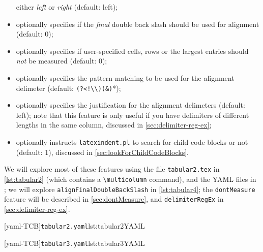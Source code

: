 \begin{itemize}
		      either \emph{left} or \emph{right} (default: left);
		\item {}
		      optionally specifies if the \emph{final} double back slash should be used for alignment
		      (default: 0);
		\item {} optionally specifies if
		      user-specified cells, rows or the largest entries should \emph{not} be measured (default:
		      0);
		\item {} optionally specifies the
		      pattern matching to be used for the alignment delimeter (default:
		      \lstinline* '(?<!\\)(&)'*);
		\item {} optionally
		      specifies the justification for the alignment delimeters (default: left); note that this
		      feature is only useful if you have delimiters of different lengths in the same column,
		      discussed in \cref{sec:delimiter-reg-ex};
		\item {} optionally instructs
		      \texttt{latexindent.pl}
		      to search for child code blocks or not (default: 1), discussed in
		      \cref{sec:lookForChildCodeBlocks}.
	\end{itemize}

	We will explore most of these features using the file \texttt{tabular2.tex} in
	\cref{lst:tabular2} (which contains a \lstinline!\multicolumn! command), and the YAML
	files in ; we will explore
	\texttt{alignFinalDoubleBackSlash} in \cref{lst:tabular4}; the \texttt{dontMeasure}
	feature will be described in \cref{sec:dontMeasure}, and \texttt{delimiterRegEx} in
	\cref{sec:delimiter-reg-ex}.

	\begin{minipage}{.45\textwidth}
		[yaml-TCB]{\texttt{tabular2.yaml}}{lst:tabular2YAML}
	\end{minipage}%
	\hfill
	\begin{minipage}{.48\textwidth}
		[yaml-TCB]{\texttt{tabular3.yaml}}{lst:tabular3YAML}
	\end{minipage}%

